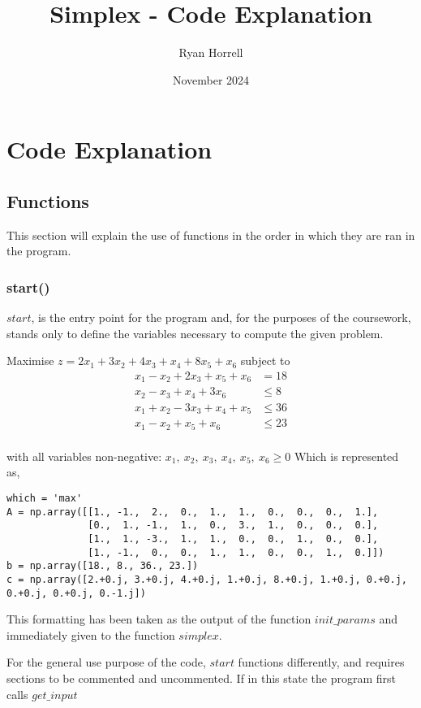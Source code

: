 \documentclass[letterpaper, a4paper]{article}
\title{Simplex - Code Explanation}
\author{Ryan Horrell}
\date{November 2024}
\begin{document}
\section{Code Explanation}

\subsection{Functions}
This section will explain the use of functions in the order in which they are ran in the program.
\subsubsection{start()}
$start$, is the entry point for the program and, for the purposes of the coursework, stands only to define the variables necessary to compute the given problem.
\newline

Maximise $z = 2x_1 + 3x_2 + 4x_3 +x_4 + 8x_5 + x_6$ subject to
\begin{align*}
x_1-x_2+2x_3+x_5+x_6 & = 18\\
    x_2-x_3+x_4+3x_6 & \le 8\\
x_1+x_2-3x_3+x_4+x_5 & \le 36\\
     x_1-x_2+x_5+x_6 & \le 23\\
\end{align*}

with all variables non-negative: $x_1,\ x_2,\ x_3,\ x_4,\ x_5,\ x_6\ge 0$
\newline
\newline
Which is represented as,
\begingroup
\fontsize{8}{10}\selectfont
\begin{verbatim}
which = 'max'
A = np.array([[1., -1.,  2.,  0.,  1.,  1.,  0.,  0.,  0.,  1.],
              [0.,  1., -1.,  1.,  0.,  3.,  1.,  0.,  0.,  0.],
              [1.,  1., -3.,  1.,  1.,  0.,  0.,  1.,  0.,  0.],
              [1., -1.,  0.,  0.,  1.,  1.,  0.,  0.,  1.,  0.]])
b = np.array([18., 8., 36., 23.])
c = np.array([2.+0.j, 3.+0.j, 4.+0.j, 1.+0.j, 8.+0.j, 1.+0.j, 0.+0.j, 0.+0.j, 0.+0.j, 0.-1.j])

\end{verbatim}
\endgroup
This formatting has been taken as the output of the function $init\_params$ and immediately given to the function $simplex$.
\newline

For the general use purpose of the code, $start$ functions differently, and requires sections to be commented and uncommented. If in this state the program first calls $get\_input$ 
\end{document}
